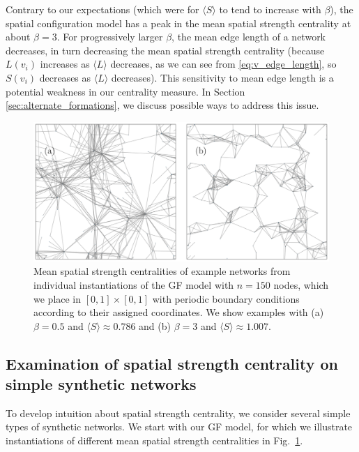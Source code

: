 \documentclass[%
 reprint,
 amsmath,amssymb,
 aps,
]{revtex4-1}
\begin{document}
Contrary to our expectations (which were for $\langle S \rangle$ to tend to increase with $\beta$), the spatial configuration model has a peak in the mean spatial strength centrality at about $\beta = 3$. For progressively larger $\beta$, the mean edge length of a network decreases, in turn decreasing the mean spatial strength centrality (because $L(v_i)$ increases as $\langle L \rangle$ decreases, as we can see from \eqref{eq:v_edge_length}, so $S(v_i)$ decreases as $\langle L \rangle$ decreases). This sensitivity to mean edge length is a potential weakness in our centrality measure. In Section \ref{sec:alternate_formations}, we discuss possible
ways to address this issue.


\begin{figure}
    \centering
    \includegraphics[width=1.0\linewidth]{geographic_example_no_highlight2horiz.pdf}
    \caption{Mean spatial strength centralities of example networks from individual instantiations of the GF model with $n=150$ nodes, which we place in {\color{red}$[0,1] \times [0,1]$ with periodic boundary conditions} according to their assigned coordinates. 
    We show examples with (a) $\beta = 0.5$ and $\langle S \rangle \approx 0.786$ and (b) $\beta = 3$ and $\langle S \rangle \approx 1.007$.
    }
    \label{fig:network_visualizations}
\end{figure}


\subsection{Examination of spatial strength centrality on simple synthetic networks}\label{synth}

To develop intuition about spatial strength centrality, we consider several simple types of synthetic networks. We start with our GF model, for which we illustrate instantiations of different mean spatial strength centralities in Fig.~\ref{fig:network_visualizations}. 
\end{document}
